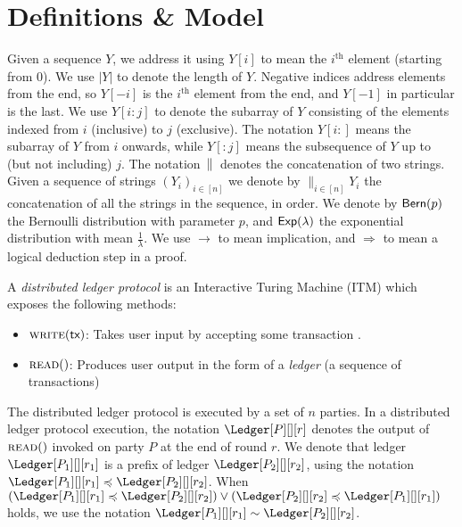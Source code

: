 \section{Definitions \& Model}

\noindent
\myparagraph[Notation]
Given a sequence $Y$, we address it using $Y[i]$ to mean the $i^\text{th}$ element (starting from $0$).
We use $|Y|$ to denote the length of $Y$.
Negative indices address elements from the end, so $Y[-i]$ is the $i^\text{th}$ element from
the end, and $Y[-1]$ in particular is the last. We use $Y[i{:}j]$ to denote the subarray of $Y$
consisting of the elements indexed from $i$ (inclusive) to $j$ (exclusive). The notation $Y[i{:}]$ means the
subarray of $Y$ from $i$ onwards, while $Y[{:}j]$ means the subsequence of $Y$ up to (but not including) $j$.
The notation $\,\|\,$ denotes the concatenation of two strings.
Given a sequence of strings $(Y_i)_{i \in [n]}$ we denote by $\big\lVert_{i \in [n]} Y_i$ the concatenation
of all the strings in the sequence, in order. We denote by $\textsf{Bern}(p)$ the Bernoulli distribution with parameter $p$,
and $\textsf{Exp}(\lambda)$ the exponential distribution with mean $\frac{1}{\lambda}$.
We use $\rightarrow$ to mean implication, and $\Rightarrow$ to mean a logical
deduction step in a proof.

\begin{definition}
  A \emph{distributed ledger protocol} is an Interactive Turing Machine (ITM)
  which exposes the following methods:

  \begin{itemize}
    \item $\textsc{write}(\textsf{tx})$:
      Takes user input by accepting some transaction \tx.
    \item $\textsc{read}()$:
      Produces user output in the form of a \emph{ledger} (a sequence of transactions)
  \end{itemize}
\end{definition}

The distributed ledger protocol is executed by a set of $n$ parties.
In a distributed ledger protocol execution, the notation
$\Ledger[P][][r]$ denotes the output of $\textsc{read}()$
invoked on party $P$ at the end of round $r$.
We denote that ledger
$\Ledger[P_1][][r_1]$ is a prefix of ledger $\Ledger[P_2][][r_2]$,
using the notation
$\Ledger[P_1][][r_1] \preccurlyeq \Ledger[P_2][][r_2]$. When
$(\Ledger[P_1][][r_1] \preccurlyeq \Ledger[P_2][][r_2]) \lor (\Ledger[P_2][][r_2] \preccurlyeq \Ledger[P_1][][r_1])$ holds,
we use the notation $\Ledger[P_1][][r_1] \sim \Ledger[P_2][][r_2]$.

